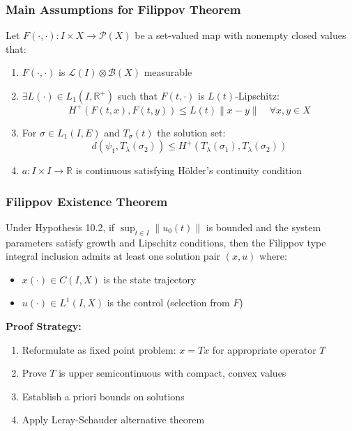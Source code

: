 \documentclass[aspectratio=169,10pt]{beamer}
\begin{document}
\begin{frame}
\frametitle{Main Assumptions for Filippov Theorem}

\begin{hypothesis}[Hypothesis 10.2]
Let $F(\cdot, \cdot): I \times X \to \mathcal{P}(X)$ be a set-valued map with nonempty closed values that:

\begin{enumerate}
    \item[(H₁)] $F(\cdot, \cdot)$ is $\mathcal{L}(I) \otimes \mathcal{B}(X)$ measurable

    \item[(H₂)] $\exists L(\cdot) \in L_1(I, \mathbb{R}^+)$ such that $F(t, \cdot)$ is $L(t)$-Lipschitz:
    \[
    H^+(F(t,x), F(t,y)) \leq L(t)\|x - y\| \quad \forall x,y \in X
    \]

    \item[(H₃)] For $\sigma \in L_1(I,E)$ and $T_\sigma(t)$ the solution set:
    \[
    d(\psi_1, T_\lambda(\sigma_2)) \leq H^+(T_\lambda(\sigma_1), T_\lambda(\sigma_2))
    \]

    \item[(H₄)] $a: I \times I \to \mathbb{R}$ is continuous satisfying Hölder's continuity condition
\end{enumerate}

\end{hypothesis}

\end{frame}

\begin{frame}
\frametitle{Filippov Existence Theorem}

\begin{theorem}
Under Hypothesis 10.2, if $\sup_{t \in I}\|u_0(t)\|$ is bounded and the system parameters satisfy growth and Lipschitz conditions, then the Filippov type integral inclusion admits at least one solution pair $(x,u)$ where:
\begin{itemize}
    \item $x(\cdot) \in C(I, X)$ is the state trajectory
    \item $u(\cdot) \in L^1(I, X)$ is the control (selection from $F$)
\end{itemize}
\end{theorem}

\vspace{0.5cm}

\textbf{Proof Strategy:}
\begin{enumerate}
    \item Reformulate as fixed point problem: $x = Tx$ for appropriate operator $T$
    \item Prove $T$ is upper semicontinuous with compact, convex values
    \item Establish a priori bounds on solutions
    \item Apply Leray-Schauder alternative theorem
\end{enumerate}

\end{frame}
\end{document}
